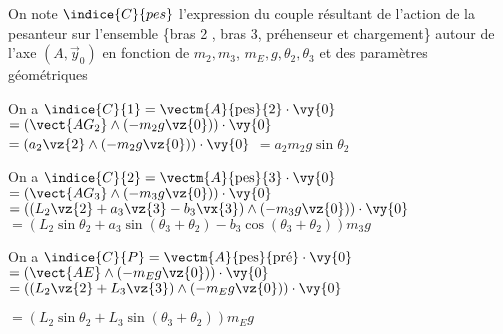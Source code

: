 
On note $\indice{C}{pes}$ l'expression du couple résultant de l'action de la pesanteur sur l'ensemble \{bras 2 , bras 3, préhenseur et chargement\} autour de l'axe $\left(A, \vec{y}_{0}\right)$ en fonction de $m_{2}, m_{3}$, $m_{E}, g, \theta_{2}, \theta_{3}$ et des paramètres géométriques
\fi

\ifprof
\begin{corrige}
On a $\indice{C}{1} = \vectm{A}{\text{pes}}{2} \cdot \vy{0}$
$ =\left( \vect{AG_2}\wedge \left(-m_2 g \vz{0}\right)\right) \cdot \vy{0} $
$ =\left( a_2 \vz{2}\wedge \left(-m_2 g \vz{0}\right) \right) \cdot \vy{0} $
$ = a_2m_2g \sin\theta_2 $

\end{corrige}
\else
\fi

\ifprof
\begin{corrige}
On a $\indice{C}{2} = \vectm{A}{\text{pes}}{3}\cdot \vy{0}$
$ =\left( \vect{AG_3}\wedge \left(-m_3 g \vz{0}\right)\right) \cdot \vy{0} $
$ =\left( \left( L_2 \vz{2}+ a_3 \vz{3}- b_3 \vx{3} \right)\wedge \left(-m_3 g \vz{0}\right)\right) \cdot \vy{0} $
$ = \left( L_2 \sin\theta_2 + a_3 \sin(\theta_3+\theta_2)- b_3 \cos(\theta_3+\theta_2) \right) m_3 g   $

\end{corrige}
\else
\fi


\ifprof
\begin{corrige}
On a $\indice{C}{P} = \vectm{A}{\text{pes}}{\text{pré}}\cdot \vy{0}$
$ =\left( \vect{AE}\wedge \left(-m_E g \vz{0}\right)\right) \cdot \vy{0} $
$ =\left( \left( L_2 \vz{2}+ L_3 \vz{3} \right)\wedge \left(-m_E g \vz{0}\right)\right) \cdot \vy{0} $

$ =  \left( L_2 \sin\theta_2+ L_3  \sin(\theta_3+\theta_2) \right) m_E g  $

\end{corrige}
\else
\fi




